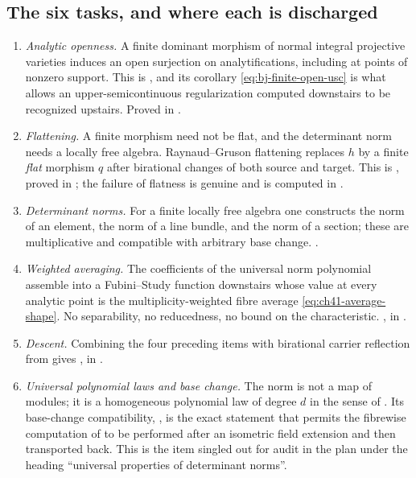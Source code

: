 \subsection{The six tasks, and where each is discharged}
\label{sec:ch41-tasks}

\begin{enumerate}
\item\label{itm:ch41-task:open}
      \emph{Analytic openness.}  A finite dominant morphism of normal
      integral projective varieties induces an open surjection on
      analytifications, including at points of nonzero support.  This is
      , and its corollary
      \eqref{eq:bj-finite-open-usc} is what allows an upper-semicontinuous
      regularization computed downstairs to be recognized upstairs.  Proved
      in .
\item\label{itm:ch41-task:flat}
      \emph{Flattening.}  A finite morphism need not be flat, and the
      determinant norm needs a locally free algebra.  Raynaud--Gruson
      flattening replaces $h$ by a finite \emph{flat} morphism $q$ after
      birational changes of both source and target.  This is
      , proved in
      ; the failure of flatness is genuine and
      is computed in .
\item\label{itm:ch41-task:norm}
      \emph{Determinant norms.}  For a finite locally free algebra one
      constructs the norm of an element, the norm of a line bundle, and the
      norm of a section; these are multiplicative and compatible with
      arbitrary base change.  .
\item\label{itm:ch41-task:average}
      \emph{Weighted averaging.}  The coefficients of the universal norm
      polynomial assemble into a Fubini--Study function downstairs whose
      value at every analytic point is the multiplicity-weighted fibre
      average \eqref{eq:ch41-average-shape}.  No separability, no
      reducedness, no bound on the characteristic.
      , in
      .
\item\label{itm:ch41-task:descent}
      \emph{Descent.}  Combining the four preceding items with birational
      carrier reflection from  gives
      , in .
\item\label{itm:ch41-task:law}
      \emph{Universal polynomial laws and base change.}  The norm is not a
      map of modules; it is a homogeneous polynomial law of degree $d$ in
      the sense of .  Its base-change
      compatibility, , is the exact
      statement that permits the fibrewise computation of
       to be performed after an isometric field
      extension and then transported back.  This is the item singled out for
      audit in the plan under the heading ``universal properties of
      determinant norms''.
\end{enumerate}


